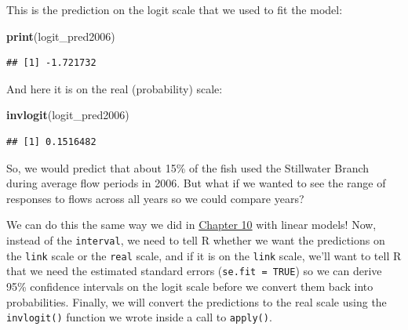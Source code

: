 \documentclass[
]{book}
\newenvironment{Shaded}{\begin{snugshade}}{\end{snugshade}}
\newcommand{\CommentTok}[1]{\textcolor[rgb]{0.56,0.35,0.01}{\textit{#1}}}
\newcommand{\FloatTok}[1]{\textcolor[rgb]{0.00,0.00,0.81}{#1}}
\newcommand{\KeywordTok}[1]{\textcolor[rgb]{0.13,0.29,0.53}{\textbf{#1}}}
\newcommand{\NormalTok}[1]{#1}
\newcommand{\OperatorTok}[1]{\textcolor[rgb]{0.81,0.36,0.00}{\textbf{#1}}}
\newcommand{\StringTok}[1]{\textcolor[rgb]{0.31,0.60,0.02}{#1}}
\begin{document}
\begin{Shaded}
\end{Shaded}

This is the prediction on the logit scale that we used to fit the model:

\begin{Shaded}
\begin{Highlighting}[]
\KeywordTok{print}\NormalTok{(logit_pred2006)}
\end{Highlighting}
\end{Shaded}

\begin{verbatim}
## [1] -1.721732
\end{verbatim}

And here it is on the real (probability) scale:

\begin{Shaded}
\begin{Highlighting}[]
\KeywordTok{invlogit}\NormalTok{(logit_pred2006)}
\end{Highlighting}
\end{Shaded}

\begin{verbatim}
## [1] 0.1516482
\end{verbatim}

So, we would predict that about 15\% of the fish used the Stillwater Branch during average flow periods in 2006. But what if we wanted to see the range of responses to flows across all years so we could compare years?

We can do this the same way we did in \protect\hyperlink{Chapter10}{Chapter 10} with linear models! Now, instead of the \texttt{interval}, we need to tell R whether we want the predictions on the \texttt{link} scale or the \texttt{real} scale, and if it is on the \texttt{link} scale, we'll want to tell R that we need the estimated standard errors (\texttt{se.fit\ =\ TRUE}) so we can derive 95\% confidence intervals on the logit scale before we convert them back into probabilities. Finally, we will convert the predictions to the real scale using the \texttt{invlogit()} function we wrote inside a call to \texttt{apply()}.
\end{document}
